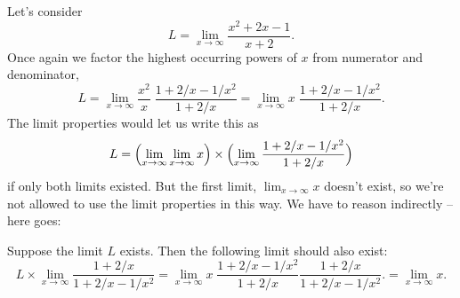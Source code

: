 Let's consider
\[
L=\lim_{x\to\infty} \frac{x^2+2x-1}{x+2}.
\]
Once again we factor the highest occurring powers of $x$ from
numerator and denominator,
\[
L=\lim_{x\to\infty}\frac{x^2}{x}\;\frac{1+2/x-1/x^2}{1+2/x}
=\lim_{x\to\infty}x\; \frac{1+2/x-1/x^2}{1+2/x}.
\]
The limit properties would let us write this as
\[
L=
\Bigl(\lim_{x\to\infty} \lim_{x\to\infty}x\Bigr) \times
\Bigl(\lim_{x\to\infty} \frac{1+2/x-1/x^2}{1+2/x}\Bigr)
\]
if only both limits existed.  But the first limit, $\lim_{x\to\infty}
x$ doesn't exist, so we're not allowed to use the limit properties in
this way.  We have to reason indirectly -- here goes:

Suppose the limit $L$ exists.  Then the following limit should also
exist:
\[
L\times \lim_{x\to\infty} \frac{1+2/x}{1+2/x-1/x^2}
=\lim_{x\to\infty}x\; \frac{1+2/x-1/x^2}{1+2/x} \frac{1+2/x}{1+2/x-1/x^2}.  
=\lim_{x\to\infty}x.
\]

